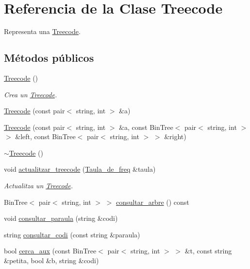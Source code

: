 \hypertarget{class_treecode}{}\section{Referencia de la Clase Treecode}
\label{class_treecode}


Representa una \hyperlink{class_treecode}{Treecode}.  


\subsection*{Métodos públicos}
\begin{DoxyCompactItemize}
\item 
\hyperlink{class_treecode_a190d6af790b7046ed7c96e7a57f0cd38}{Treecode} ()
\begin{DoxyCompactList}\small\item\em Crea un \hyperlink{class_treecode}{Treecode}. \end{DoxyCompactList}\item 
\hyperlink{class_treecode_a92ec92e0e44e910e546c6d1943bd44ea}{Treecode} (const pair$<$ string, int $>$ \&a)
\item 
\hyperlink{class_treecode_aaf75f31e3d5abfe7c1f0439489ad45d0}{Treecode} (const pair$<$ string, int $>$ \&a, const Bin\+Tree$<$ pair$<$ string, int $>$ $>$ \&left, const Bin\+Tree$<$ pair$<$ string, int $>$ $>$ \&right)
\item 
\hyperlink{class_treecode_a4b25e99b1a356dbcf9901c1e63105b1b}{$\sim$\+Treecode} ()
\item 
void \hyperlink{class_treecode_a9b9e9d2f0cce1d4293a7e28ab0ba76f7}{actualitzar\+\_\+treecode} (\hyperlink{class_taula__de__freq}{Taula\+\_\+de\+\_\+freq} \&taula)
\begin{DoxyCompactList}\small\item\em Actualitza un \hyperlink{class_treecode}{Treecode}. \end{DoxyCompactList}\item 
Bin\+Tree$<$ pair$<$ string, int $>$ $>$ \hyperlink{class_treecode_a781e52014473e0a905763a6a537cc2aa}{consultar\+\_\+arbre} () const
\item 
void \hyperlink{class_treecode_a3d3b580b42b739716f168d71cb0e3c8c}{consultar\+\_\+paraula} (string \&codi)
\item 
string \hyperlink{class_treecode_adee719707b72a25e70e3c108d0bd60a1}{consultar\+\_\+codi} (const string \&paraula)
\item 
bool \hyperlink{class_treecode_ac320d8634179b2ab24dc89bd706264ca}{cerca\+\_\+aux} (const Bin\+Tree$<$ pair$<$ string, int $>$ $>$ \&t, const string \&petita, bool \&b, string \&codi)

\end{DoxyCompactItemize}
